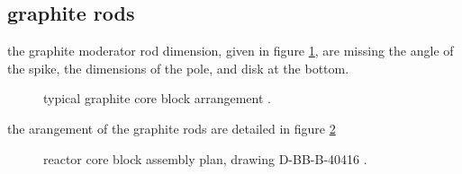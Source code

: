 \documentclass{article}
\begin{document}
\begin{preview}
\subsection{graphite rods}
the graphite moderator rod dimension, given in figure \ref{3229-fig2}, are missing the angle of the spike, the dimensions of the pole, and disk at the bottom.
\begin{figure}[H]
  \centering
  \centering
  \caption{typical graphite core block arrangement \parencite[figure 2]{ornl-tm-3229}.}
  \label{3229-fig2}
\end{figure}

the arangement of the graphite rods are detailed in figure \ref{4174-p10-p11}
\begin{figure}[H]
  \centering
  \caption{reactor core block assembly plan, drawing D-BB-B-40416 \parencite[page 10-11]{ornl-tm-4174}.}
  \label{4174-p10-p11}
\end{figure}




\end{preview}
\end{document}
